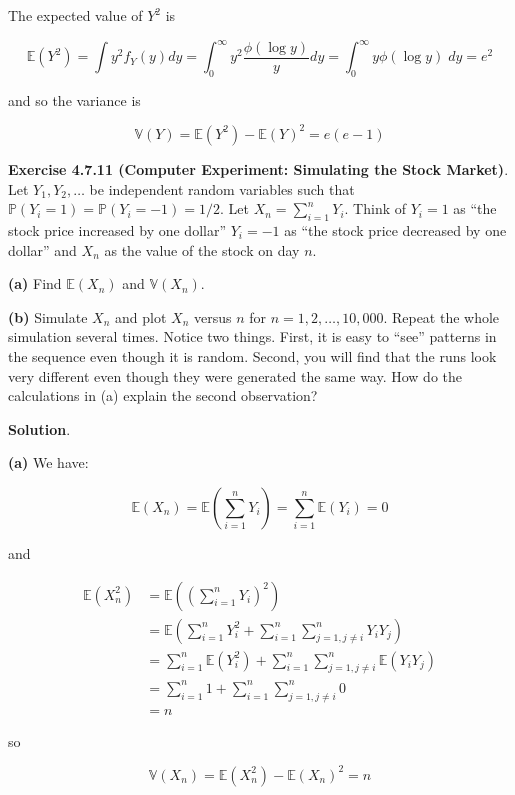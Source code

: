 The expected value of \(Y^{2}\) is

\[ \mathbb{E}(Y^{2}) = \int y^{2} f_Y(y) dy = \int_{0}^{\infty} y^{2} \frac{\phi(\log y)}{y} dy = \int_{0}^{\infty} y \phi(\log y)\; dy = e^{2}\]

and so the variance is

\[ \mathbb{V}(Y) = \mathbb{E}(Y^{2}) - \mathbb{E}(Y)^{2} = e(e - 1) \]

\textbf{Exercise 4.7.11 (Computer Experiment: Simulating the Stock
Market)}. Let \(Y_{1}, Y_{2}, \dots\) be independent random variables such
that \(\mathbb{P}(Y_{i} = 1) = \mathbb{P}(Y_{i} = -1) = 1/2\). Let
\(X_{n} = \sum_{i=1}^{n} Y_{i}\). Think of \(Y_{i} = 1\) as ``the stock price
increased by one dollar'' \(Y_{i} = -1\) as ``the stock price decreased by
one dollar'' and \(X_{n}\) as the value of the stock on day \(n\).

\textbf{(a)} Find \(\mathbb{E}(X_{n})\) and \(\mathbb{V}(X_{n})\).

\textbf{(b)} Simulate \(X_{n}\) and plot \(X_{n}\) versus \(n\) for
\(n = 1, 2, \dots, 10,000\). Repeat the whole simulation several times.
Notice two things. First, it is easy to ``see'' patterns in the sequence
even though it is random. Second, you will find that the runs look very
different even though they were generated the same way. How do the
calculations in (a) explain the second observation?

\textbf{Solution}.

\textbf{(a)} We have:

\[ \mathbb{E}(X_{n}) = \mathbb{E}\left( \sum_{i=1}^{n} Y_{i} \right) = \sum_{i=1}^{n} \mathbb{E}(Y_{i}) = 0 \]

and

\begin{align*}
\mathbb{E}(X_{n}^{2}) &= \mathbb{E}\left( \left( \sum_{i=1}^{n} Y_{i} \right)^{2} \right) \\
&= \mathbb{E}\left( \sum_{i=1}^{n} Y_{i}^{2} + \sum_{i=1}^{n} \sum_{j = 1, j \neq i}^{n} Y_{i} Y_{j} \right) \\
&= \sum_{i=1}^{n} \mathbb{E}(Y_{i}^{2}) + \sum_{i=1}^{n} \sum_{j = 1, j \neq i}^{n} \mathbb{E}(Y_{i} Y_{j}) \\
&= \sum_{i=1}^{n} 1 + \sum_{i=1}^{n} \sum_{j = 1, j \neq i}^{n} 0 \\
&= n
\end{align*}

so

\[\mathbb{V}(X_{n}) = \mathbb{E}(X_{n}^{2}) - \mathbb{E}(X_{n})^{2} = n\]

